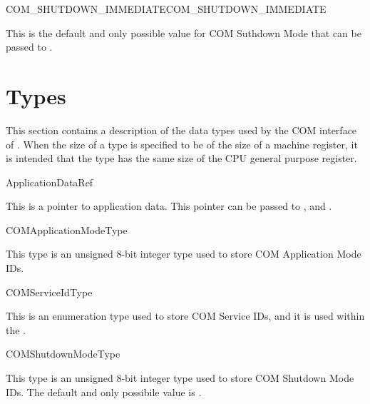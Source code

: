 \begin{constant2}{COM\_SHUTDOWN\_IMMEDIATE}{COM_SHUTDOWN_IMMEDIATE}
  \begin{constantdescription}
    This is the default and only possible value for COM Suthdown Mode that can 
    be passed to .
  \end{constantdescription}
\end{constant2}

\pagebreak




\section{Types}
\label{sec:types}

This section contains a description of the data types used by the COM
interface of \ee. When the size of a type is specified to be of the
size of a machine register, it is intended that the type has the same
size of the CPU general purpose register.

\begin{type}{ApplicationDataRef}
  \begin{typedescription}
    This is a pointer to application data. This pointer can be passed to 
    ,  and .  
  \end{typedescription}
\end{type}

\begin{type}{COMApplicationModeType}
  \begin{typedescription}
   This type is an unsigned 8-bit integer type used to store COM Application Mode 
   IDs.
  \end{typedescription}
\end{type}

\begin{type}{COMServiceIdType}
  \begin{typedescription}
    This is an enumeration type used to store COM Service IDs, and it is used 
    within the .
  \end{typedescription}
\end{type}

\begin{type}{COMShutdownModeType}
  \begin{typedescription}
    This type is an unsigned 8-bit integer type used to store COM Shutdown Mode 
    IDs. The default and only possibile value is . 
  \end{typedescription}
\end{type}

